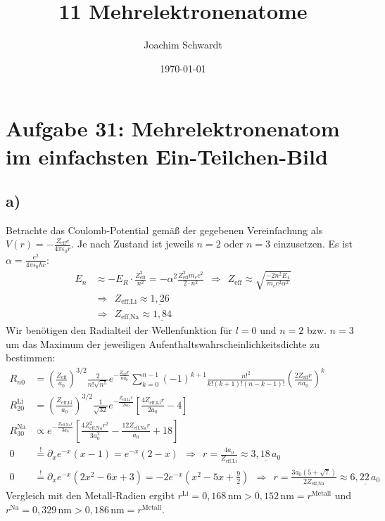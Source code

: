\documentclass[a4paper,12pt]{article}
\newcommand{\kla}{}
\newcommand{\klam}{}
\newcommand{\tecxt}{}
\begin{document}
\title{11 Mehrelektronenatome}
\author{Joachim Schwardt}
\date{\today}
\maketitle

\section*{Aufgabe 31: Mehrelektronenatom im einfachsten Ein-Teilchen-Bild}
\subsection*{a)}
Betrachte das Coulomb-Potential gemäß der gegebenen Vereinfachung als $V(r)=-\frac{Z_\tecxt\text{eff}e}{4\pi\epsilon_0r}$. Je nach Zustand ist jeweils $n=2$ oder $n=3$ einzusetzen. Es ist $\alpha=\frac{e^2}{4\pi\epsilon_0\hbar c}$:
\begin{align*}
E_n&\approx -E_R\cdot\frac{Z_\tecxt\text{eff}^2}{n^2}=-\alpha^2\frac{Z_\tecxt\text{eff}^2m_ec^2}{2\cdot n^2}\ \ \Rightarrow\ \ Z_\tecxt\text{eff}\approx\sqrt{\frac{-2n^2E_1}{m_ec^2\alpha^2}}\\
&\Rightarrow\ \ Z_\tecxt\text{eff,Li}\approx\underline{1,26}\\
&\Rightarrow\ \ Z_\tecxt\text{eff,Na}\approx\underline{1,84}
\end{align*}
Wir benötigen den Radialteil der Wellenfunktion für $l=0$ und $n=2$ bzw. $n=3$ um das Maximum der jeweiligen Aufenthaltswahrscheinlichkeitsdichte zu bestimmen:
\begin{align*}
R_{n0}&=\kla\left( {\frac{Z_\tecxt\text{eff}}{a_0}} \right)^{3/2}\frac{2}{n!\sqrt{n^5}}e^{-\frac{Z_\tecxt\text{eff}r}{na_0}}\sum_{k=0}^{n-1}(-1)^{k+1}\frac{n!^2}{k!(k+1)!(n-k-1)!}\kla\left( {\frac{2Z_\tecxt\text{eff}r}{na_0}} \right)^k\\
R_{20}^\tecxt\text{Li}&=\kla\left( {\frac{Z_\tecxt\text{eff,Li}}{a_0}} \right)^{3/2}\frac{1}{\sqrt{32}}e^{-\frac{Z_\tecxt\text{eff,Li}r}{2a_0}}\klam\left[ {\frac{4Z_\tecxt\text{eff,Li}r}{2a_0}-4} \right]\\
R_{30}^\tecxt\text{Na}&\propto e^{-\frac{Z_\tecxt\text{eff,Na}r}{3a_0}}\klam\left[ {\frac{4Z_\tecxt\text{eff,Na}^2r^2}{3a_0^2}-\frac{12Z_\tecxt\text{eff,Na}r}{a_0}+18} \right]\\
0&\overset{!}{=}\partial_x e^{-x}\kla\left( {x-1} \right)=e^{-x}\kla\left( {2-x} \right)\ \ \Rightarrow\ \ r=\frac{4a_0}{Z_\tecxt\text{eff,Li}}\approx\underline{3,18\,a_0}\\
0&\overset{!}{=}\partial_x e^{-x}\kla\left( {2x^2-6x+3} \right)=-2e^{-x}\kla\left( {x^2-5x+\frac{9}{2}} \right)\ \ \Rightarrow\ \ r=\frac{3a_0(5+\sqrt{7})}{2Z_\tecxt\text{eff,Na}}\approx\underline{6,22\,a_0}
\end{align*}
Vergleich mit den Metall-Radien ergibt $r^\tecxt\text{Li}=0,168\,\tecxt\text{nm}>0,152\,\tecxt\text{nm}=r^\tecxt\text{Metall}$ und $r^\tecxt\text{Na}=0,329\,\tecxt\text{nm}>0,186\,\tecxt\text{nm}=r^\tecxt\text{Metall}$.
\end{document}
